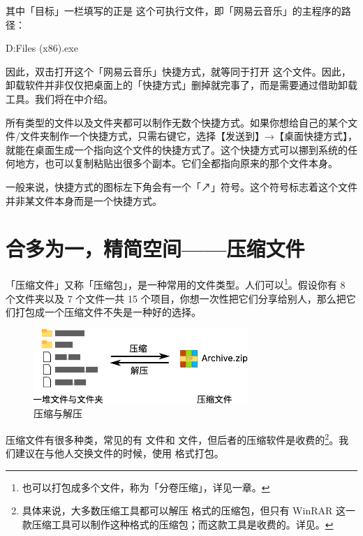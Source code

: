{{其中「目标」一栏填写的正是  这个可执行文件，即「网易云音乐」的主程序的路径：

\begin{MissingVerbatim}
  D:\Program Files (x86)\Netease\CloudMusic\cloudmusic.exe
\end{MissingVerbatim}

因此，双击打开这个「网易云音乐」快捷方式，就等同于打开  这个文件。\cprotect{}因此，卸载软件并非仅仅把桌面上的「快捷方式」删掉就完事了，而是需要通过借助卸载工具。我们将在中介绍。

所有类型的文件以及文件夹都可以制作无数个快捷方式。如果你想给自己的某个文件/文件夹制作一个快捷方式，只需右键它，选择【发送到】→【桌面快捷方式】，就能在桌面生成一个指向这个文件的快捷方式了。这个快捷方式可以挪到系统的任何地方，也可以复制粘贴出很多个副本。它们全都指向原来的那个文件本身。

一般来说，快捷方式的图标左下角会有一个「↗」符号。这个符号标志着这个文件并非某文件本身而是一个快捷方式。

\section{合多为一，精简空间——压缩文件}

「压缩文件」又称「压缩包」，是一种常用的文件类型。人们可以\footnote{也可以打包成多个文件，称为「分卷压缩」，详见一章。}。假设你有 8 个文件夹以及 7 个文件一共 15 个项目，你想一次性把它们分享给别人，那么把它们打包成一个压缩文件不失是一种好的选择。

\begin{figure}[htb!]
  \centering
  \includegraphics[width=.7\textwidth]{assets/basic/Compress_and_decompress.pdf}
  \caption{压缩与解压}
  \label{fig:Compress_and_decompress}
\end{figure}

压缩文件有很多种类，常见的有  文件和  文件，但后者的压缩软件是收费的\cprotect\footnote{具体来说，大多数压缩工具都可以解压  格式的压缩包，但只有 WinRAR 这一款压缩工具可以制作这种格式的压缩包；而这款工具是收费的。详见。}。我们建议在与他人交换文件的时候，使用 格式打包。

}}
